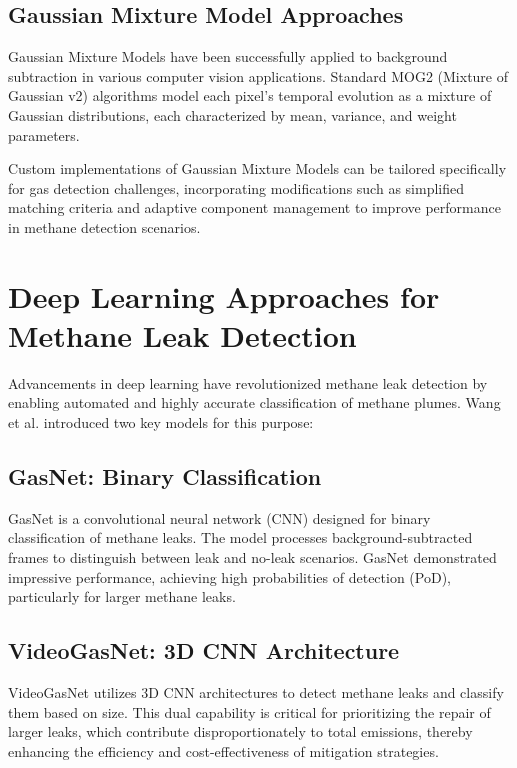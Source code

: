 \subsection{Gaussian Mixture Model Approaches}

Gaussian Mixture Models have been successfully applied to background subtraction in various computer vision applications. Standard MOG2 (Mixture of Gaussian v2) algorithms model each pixel's temporal evolution as a mixture of Gaussian distributions, each characterized by mean, variance, and weight parameters.

Custom implementations of Gaussian Mixture Models can be tailored specifically for gas detection challenges, incorporating modifications such as simplified matching criteria and adaptive component management to improve performance in methane detection scenarios.

\section{Deep Learning Approaches for Methane Leak Detection}

Advancements in deep learning have revolutionized methane leak detection by enabling automated and highly accurate classification of methane plumes. Wang et al. introduced two key models for this purpose:

\subsection{GasNet: Binary Classification}

GasNet is a convolutional neural network (CNN) designed for binary classification of methane leaks. The model processes background-subtracted frames to distinguish between leak and no-leak scenarios. GasNet demonstrated impressive performance, achieving high probabilities of detection (PoD), particularly for larger methane leaks.

\subsection{VideoGasNet: 3D CNN Architecture}

VideoGasNet utilizes 3D CNN architectures to detect methane leaks and classify them based on size. This dual capability is critical for prioritizing the repair of larger leaks, which contribute disproportionately to total emissions, thereby enhancing the efficiency and cost-effectiveness of mitigation strategies.

